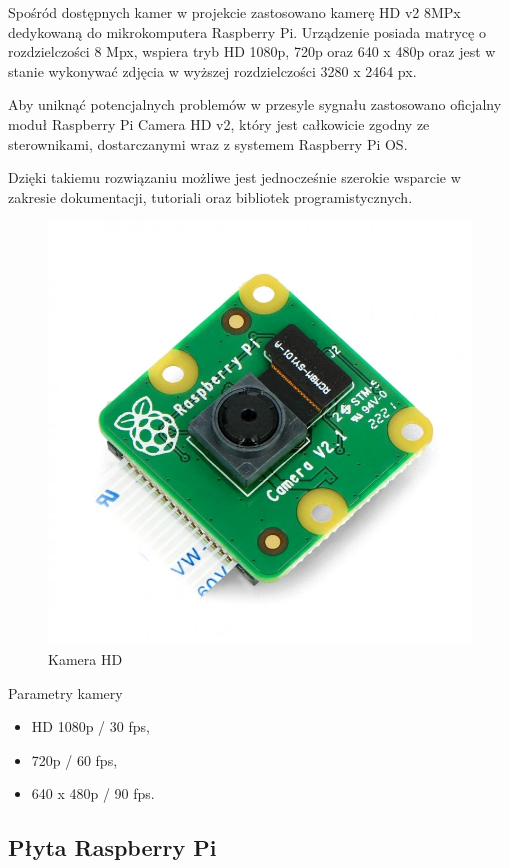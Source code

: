 \documentclass[a4paper,12pt,reqno]{article}
\begin{document}
Spośród dostępnych kamer w projekcie zastosowano kamerę  HD v2 8MPx dedykowaną do mikrokomputera Raspberry Pi. Urządzenie posiada matrycę o rozdzielczości 8 Mpx, wspiera tryb HD 1080p, 720p oraz 640 x 480p oraz jest w stanie wykonywać zdjęcia w wyższej rozdzielczości 3280 x 2464 px.

Aby uniknąć potencjalnych problemów w przesyle sygnału zastosowano oficjalny moduł Raspberry Pi Camera HD v2, który jest całkowicie zgodny ze sterownikami, dostarczanymi wraz z systemem Raspberry Pi OS.

Dzięki takiemu rozwiązaniu możliwe jest jednocześnie szerokie wsparcie w zakresie dokumentacji, tutoriali oraz bibliotek programistycznych.

\begin{figure}[H]%
\centering
\includegraphics[width=0.8\columnwidth]{imgs/camera.jpg}
\caption{Kamera HD \cite{img_cam} \label{kamera}}
\quad
\end{figure}

Parametry kamery

\begin{itemize}
	\item HD 1080p / 30 fps,
	\item 720p / 60 fps,
	\item 640 x 480p / 90 fps.
\end{itemize}

\subsection{Płyta Raspberry Pi}
\end{document}
